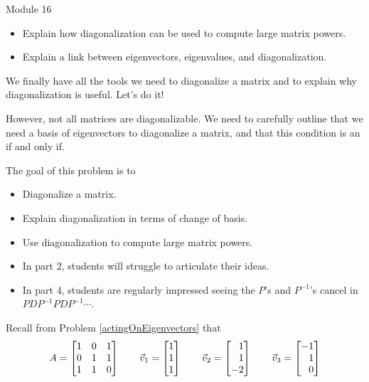 \begin{lesson}

	Module 16

	\begin{itemize}
		\item Explain how diagonalization can be used to compute large matrix powers.
		\item Explain a link between eigenvectors, eigenvalues, and diagonalization.

	\end{itemize}

	We finally have all the tools we need to diagonalize a matrix and to explain why diagonalization is useful.
	Let's do it!

	However, not all matrices are diagonalizable. We need to carefully outline that we need a
	basis of eigenvectors to diagonalize a matrix, and that this condition is an if and only if.

\end{lesson}
	\bookonlynewpage
	\question
	\begin{annotation}
		\begin{goals}

			The goal of this problem is to
			\begin{itemize}
				\item Diagonalize a matrix.
				\item Explain diagonalization in terms of change of basis.
				\item Use diagonalization to compute large matrix powers.
			\end{itemize}
		\end{goals}

		\begin{notes}
			\begin{itemize}
				\item In part 2, students will struggle to articulate their ideas.
				\item In part 4, students are regularly impressed seeing the $P$'s and
					$P^{-1}$'s cancel in $PDP^{-1}PDP^{-1}\cdots$.
			\end{itemize}
		\end{notes}
	\end{annotation}
	Recall from Problem \ref{actingOnEigenvectors} that
	\[
		A=\mat{1&0&1\\0&1&1\\1&1&0}\qquad
		\vec v_1=\mat{1\\1\\1}\qquad
		\vec v_2=\mat{1\\1\\-2}\qquad
		\vec v_3=\mat{-1\\1\\0}
	\]
